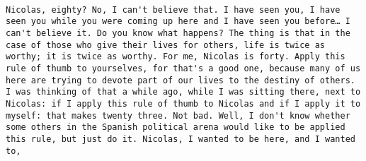 \documentclass[
]{article}
\begin{document}
\begin{verbatim}
                                                                                                                                                                                                                                                                                                                                                                                                                                                                                                                                                                                                                                                                                                                                                                                                                                                                                                                                                                                                                                                                                                                                                                                                                                                                                                                                                                                                                                                                                                                                                                                                                                                                                                                                                                                                                                                                                                                                                                                                                                                                                                                                                                                                                                                                                                                                                                                                                                                                                                                                                                                     Nicolas, eighty? No, I can't believe that. I have seen you, I have seen you while you were coming up here and I have seen you before… I can't believe it. Do you know what happens? The thing is that in the case of those who give their lives for others, life is twice as worthy; it is twice as worthy. For me, Nicolas is forty. Apply this rule of thumb to yourselves, for that's a good one, because many of us here are trying to devote part of our lives to the destiny of others. I was thinking of that a while ago, while I was sitting there, next to Nicolas: if I apply this rule of thumb to Nicolas and if I apply it to myself: that makes twenty three. Not bad. Well, I don't know whether some others in the Spanish political arena would like to be applied this rule, but just do it. Nicolas, I wanted to be here, and I wanted to, 
\end{verbatim}
\end{document}
